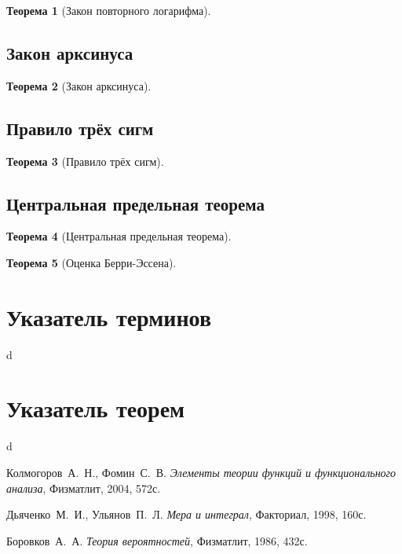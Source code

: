 \documentclass[12pt]{article}
\newtheorem{theorem}{Теорема}
\numberwithin{theorem}{section}
\theoremstyle{definition}
\begin{document}
	\begin{theorem}[Закон повторного логарифма]
		
	\end{theorem}
	
	\subsection{Закон арксинуса}
	
	\begin{theorem}[Закон арксинуса]
		
	\end{theorem}
	
	\subsection{Правило трёх сигм}
	
	\begin{theorem}[Правило трёх сигм]
		
	\end{theorem}
	
	\subsection{Центральная предельная теорема}
	
	\begin{theorem}[Центральная предельная теорема]
		
	\end{theorem}
	
	\begin{theorem}[Оценка Берри-Эссена]
		
	\end{theorem}
	
	
	
	\section{Указатель терминов}
	
	d
	
	\section{Указатель теорем}
	
	d
	
	\begin{thebibliography}{2}
		
		 Колмогоров~А.~Н., Фомин~С.~В. {\it Элементы теории функций и функционального анализа}, Физматлит, 2004, 572с.
		
		 Дьяченко~М.~И., Ульянов~П.~Л. {\it Мера и интеграл}, Факториал, 1998, 160с.
	
		 Боровков~А.~А. {\it Теория вероятностей}, Физматлит, 1986, 432с.
	
	\end{thebibliography}
	
	
\end{document}
